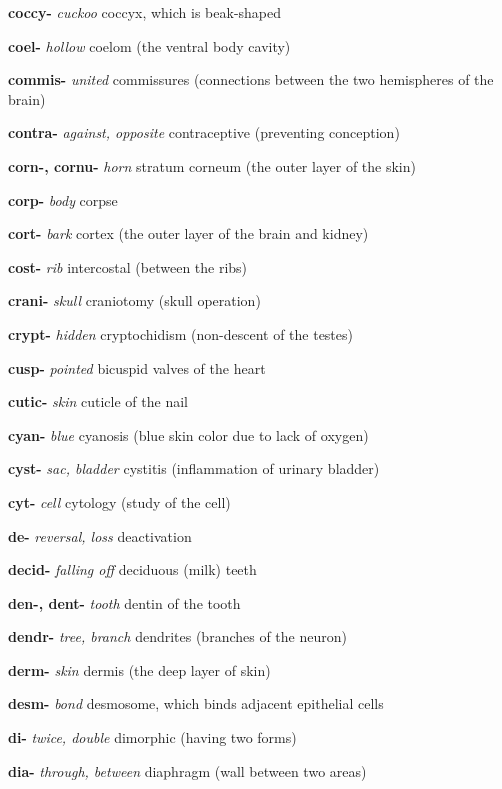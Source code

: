 \documentclass[10pt]{article}
\begin{document}
\begin{multicols}{2}
\begin{hangparas}{10pt}{1}
 \textbf{coccy- } \textit{cuckoo} coccyx, which is beak-shaped \par
 \textbf{coel- } \textit{hollow} coelom (the ventral body cavity) \par
 \textbf{commis- } \textit{united} commissures (connections between the two hemispheres of the brain) \par
 \textbf{contra- } \textit{against, opposite} contraceptive (preventing conception) \par
 \textbf{corn-, cornu- } \textit{horn} stratum corneum (the outer layer of the skin) \par
 \textbf{corp- } \textit{body } corpse \par
 \textbf{cort- } \textit{bark } cortex (the outer layer of the brain and kidney) \par
 \textbf{cost- } \textit{rib } intercostal (between the ribs) \par
 \textbf{crani- } \textit{skull } craniotomy (skull operation) \par
 \textbf{crypt- } \textit{hidden} cryptochidism (non-descent of the testes) \par
 \textbf{cusp- } \textit{pointed} bicuspid valves of the heart \par
 \textbf{cutic- } \textit{skin } cuticle of the nail \par
 \textbf{cyan- } \textit{blue } cyanosis (blue skin color due to lack of oxygen) \par
 \textbf{cyst- } \textit{sac, bladder} cystitis (inflammation of urinary bladder) \par
 \textbf{cyt- } \textit{cell} cytology (study of the cell) \par
 \textbf{de-} \textit{reversal, loss} deactivation \par
 \textbf{decid-} \textit{falling off} deciduous (milk) teeth \par
 \textbf{den-, dent-} \textit{tooth} dentin of the tooth \par
 \textbf{dendr-} \textit{tree, branch} dendrites (branches of the neuron) \par
 \textbf{derm-} \textit{skin} dermis (the deep layer of skin) \par
 \textbf{desm-} \textit{bond} desmosome, which binds adjacent epithelial cells \par
 \textbf{di-} \textit{twice, double} dimorphic (having two forms) \par
 \textbf{dia-} \textit{through, between} diaphragm (wall between two areas) \par

\end{hangparas}
\end{multicols}
\end{document}
